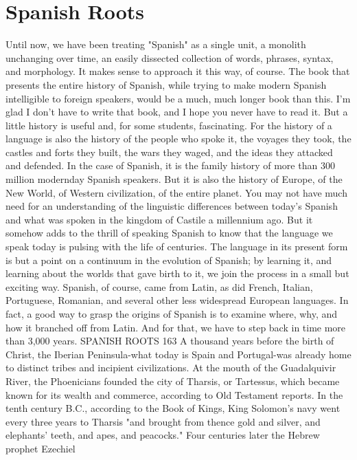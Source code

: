 \chapter{Spanish Roots}

Until now, we have been treating "Spanish" as a single unit,
a monolith unchanging over time, an easily dissected collection of
words, phrases, syntax, and morphology. It makes sense to approach it
this way, of course. The book that presents the entire history of Spanish, while trying to make modern Spanish intelligible to foreign speakers, would be a much, much longer book than this. I'm glad I don't
have to write that book, and I hope you never have to read it.
But a little history is useful and, for some students, fascinating. For the history of a language is also the history of the people who
spoke it, the voyages they took, the castles and forts they built, the
wars they waged, and the ideas they attacked and defended. In the case
of Spanish, it is the family history of more than 300 million modernday Spanish speakers. But it is also the history of Europe, of the New
World, of Western civilization, of the entire planet.
You may not have much need for an understanding of the linguistic differences between today's Spanish and what was spoken in
the kingdom of Castile a millennium ago. But it somehow adds to the
thrill of speaking Spanish to know that the language we speak today is
pulsing with the life of centuries. The language in its present form is
but a point on a continuum in the evolution of Spanish; by learning it,
and learning about the worlds that gave birth to it, we join the process
in a small but exciting way.
Spanish, of course, came from Latin, as did French, Italian,
Portuguese, Romanian, and several other less widespread European
languages. In fact, a good way to grasp the origins of Spanish is to examine where, why, and how it branched off from Latin. And for that,
we have to step back in time more than 3,000 years.
SPANISH ROOTS 163
A thousand years before the birth of Christ, the Iberian Peninsula-what today is Spain and Portugal-was already home to distinct tribes and incipient civilizations. At the mouth of the Guadalquivir River, the Phoenicians founded the city of Tharsis, or Tartessus,
which became known for its wealth and commerce, according to Old
Testament reports. In the tenth century B.C., according to the Book
of Kings, King Solomon's navy went every three years to Tharsis
"and brought from thence gold and silver, and elephants' teeth, and
apes, and peacocks." Four centuries later the Hebrew prophet Ezechiel
